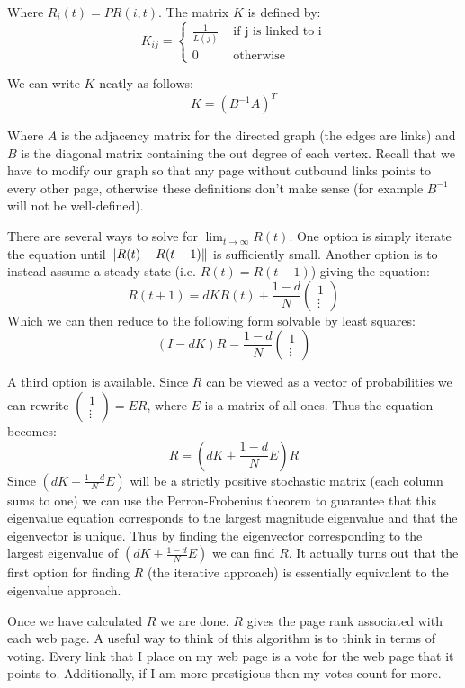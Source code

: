 Where $R_i(t) = PR(i,t)$. The matrix $K$ is defined by:
\[K_{ij} = \begin{cases} \frac{1}{L(j)} & \mbox{ if j is linked to i} \\ 0 & \mbox{ otherwise} \end{cases}\]

We can write $K$ neatly as follows:
\[K = (B^{-1}A)^T\]

Where $A$ is the adjacency matrix for the directed graph (the edges are links) and $B$ is the diagonal matrix containing the out degree of each vertex.
Recall that we have to modify our graph so that any page without outbound links points to every other page, otherwise these definitions don't make sense (for example $B^{-1}$ will not be well-defined).

There are several ways to solve for $\lim_{t \to \infty} R(t)$.
One option is simply iterate the equation until $\left\lVert R(t)-R(t-1)\right\rVert$ is sufficiently small.
Another option is to instead assume a steady state (i.e. $R(t) = R(t-1)$) giving the equation:
\[R(t+1) = d K R(t) + \frac{1-d}{N} \begin{pmatrix}1\\\vdots\end{pmatrix}\]
Which we can then reduce to the following form solvable by least squares:
\[(I-dK)R = \frac{1-d}{N} \begin{pmatrix}1\\\vdots\end{pmatrix}\]

A third option is available.
Since $R$ can be viewed as a vector of probabilities we can rewrite $\left(\begin{smallmatrix}1\\\vdots\end{smallmatrix}\right) = E R$, where $E$ is a matrix of all ones.
Thus the equation becomes:
\[R = (dK + \frac{1-d}{N}E)R\]
Since $(dK + \frac{1-d}{N}E)$ will be a strictly positive stochastic matrix (each column sums to one) we can use the Perron-Frobenius theorem to guarantee that this eigenvalue equation corresponds to the largest magnitude eigenvalue and that the eigenvector is unique.
Thus by finding the eigenvector corresponding to the largest eigenvalue of $(dK + \frac{1-d}{N}E)$ we can find $R$.
It actually turns out that the first option for finding $R$ (the iterative approach) is essentially equivalent to the eigenvalue approach.

Once we have calculated $R$ we are done.
$R$ gives the page rank associated with each web page.
A useful way to think of this algorithm is to think in terms of voting.
Every link that I place on my web page is a vote for the web page that it points to.
Additionally, if I am more prestigious then my votes count for more.

